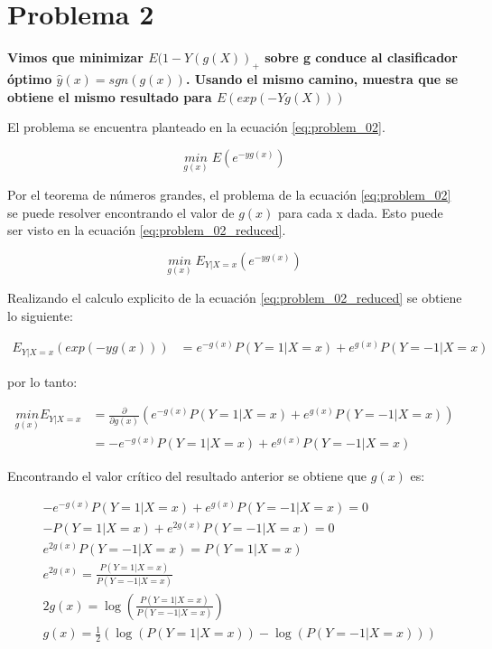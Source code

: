 \section*{Problema 2}

\textbf{Vimos que minimizar $E(1-Y(g(X))_+$ sobre g conduce al clasificador óptimo $\hat{y}(x)=sgn(g(x))$. Usando el mismo camino, muestra que se obtiene el mismo resultado para $E(exp(-Yg(X)))$}

El problema se encuentra planteado en la ecuación \ref{eq:problem_02}.

\begin{equation}
    \underset{g(x)}{min}\; E(e^{-yg(x)}) \label{eq:problem_02}
\end{equation}

Por el teorema de números grandes, el problema de la ecuación \ref{eq:problem_02} se puede resolver encontrando el valor de $g(x)$ para cada x dada. Esto puede ser visto en la ecuación \ref{eq:problem_02_reduced}.

\begin{equation}
    \underset{g(x)}{min}\; E_{Y|X=x} (e^{-yg(x)}) \label{eq:problem_02_reduced}
\end{equation}

Realizando el calculo explicito de la ecuación \ref{eq:problem_02_reduced} se obtiene lo siguiente:

\begin{align*}
    E_{Y|X=x} (exp(-yg(x))) & = e^{-g(x)} P(Y=1|X=x) + e^{g(x)} P(Y=-1| X=x)
\end{align*}

por lo tanto:

\begin{align*}
    \underset{g(x)}{min} E_{Y|X=x} & = \frac{\partial}{\partial g(x)} \left (e^{-g(x)} P(Y=1|X=x) + e^{g(x)} P(Y=-1| X=x) \right ) \\
                                   & = -e^{-g(x)} P(Y=1|X=x) + e^{g(x)} P(Y=-1| X=x)
\end{align*}

Encontrando el valor crítico del resultado anterior se obtiene que $g(x)$ es:

\begin{align*}
     & -e^{-g(x)} P(Y=1|X=x) + e^{g(x)} P(Y=-1| X=x)  = 0                                                                \\
     & -P(Y=1|X=x) + e^{2g(x)} P(Y=-1|X=x)            = 0                                                                \\
     & e^{2g(x)} P(Y=-1|X=x)                          = P(Y=1|X=x)                                                       \\
     & e^{2g(x)}                                      = \frac{P(Y=1|X=x)}{P(Y=-1|X=x)}                                   \\
     & 2g(x)                                          = \log \left ( \frac{P(Y=1|X=x)}{P(Y=-1|X=x)}\right )              \\
     & g(x)                                           = \frac{1}{2} \left (\log (P(Y=1|X=x))-\log (P(Y=-1|X=x)) \right )
\end{align*}

